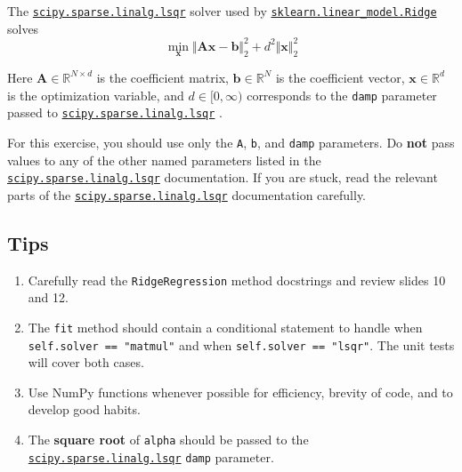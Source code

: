 \documentclass{article}
\numberwithin{equation}{section}
\newcommand{\lsqr}{%
    \href{%
        https://docs.scipy.org/doc/scipy/reference/generated/%
        scipy.sparse.linalg.lsqr.html%
    }{\texttt{scipy.sparse.linalg.lsqr}}%
}
\newcommand{\skridge}{%
    \href{%
        https://scikit-learn.org/stable/modules/generated/%
        sklearn.linear_model.Ridge.html%
    }{\texttt{sklearn.linear\_model.Ridge}}%
}
\begin{document}
The \lsqr{} solver used by \skridge{} solves
\begin{equation*}
    \min_\mathbf{x}\Vert\mathbf{Ax} - \mathbf{b}\Vert_2^2 +
    d^2\Vert\mathbf{x}\Vert_2^2
\end{equation*}

Here $ \mathbf{A} \in \mathbb{R}^{N \times d} $ is the coefficient matrix,
$ \mathbf{b} \in \mathbb{R}^N $ is the coefficient vector, $ \mathbf{x} \in
\mathbb{R}^d $ is the optimization variable, and $ d \in [0, \infty) $
corresponds to the \texttt{damp} parameter passed to \lsqr.

\medskip

For this exercise, you should use only the \texttt{A}, \texttt{b}, and
\texttt{damp} parameters. Do \textbf{not} pass values to any of the other
named parameters listed in the \lsqr{} documentation. If you are stuck, read
the relevant parts of the \lsqr{} documentation carefully.

\subsection{Tips}

\begin{enumerate}
    \item
    Carefully read the \texttt{RidgeRegression} method docstrings and review
    slides 10 and 12.

    \item
    The \texttt{fit} method should contain a conditional statement to handle
    when \texttt{self.solver == "matmul"} and when
    \texttt{self.solver == "lsqr"}. The unit tests will cover both cases.

    \item
    Use NumPy functions whenever possible for efficiency, brevity of code, and
    to develop good habits.

    \item
    The \textbf{square root} of \texttt{alpha} should be passed to the \lsqr{}
    \texttt{damp} parameter.
\end{enumerate}
\end{document}
